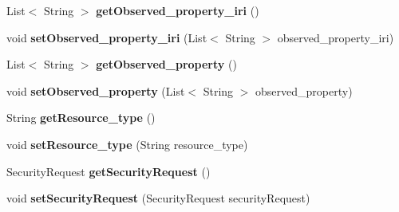 \begin{DoxyCompactItemize}
List$<$ String $>$ {\bfseries get\+Observed\+\_\+property\+\_\+iri} ()
\item 
\mbox{\label{classeu_1_1h2020_1_1symbiote_1_1core_1_1internal_1_1CoreQueryRequest_a1b3772c248abf9efe26d8bb9677edf5d}} 
void {\bfseries set\+Observed\+\_\+property\+\_\+iri} (List$<$ String $>$ observed\+\_\+property\+\_\+iri)
\item 
\mbox{\label{classeu_1_1h2020_1_1symbiote_1_1core_1_1internal_1_1CoreQueryRequest_ada10d758c4139edcbc191a20d68ad844}} 
List$<$ String $>$ {\bfseries get\+Observed\+\_\+property} ()
\item 
\mbox{\label{classeu_1_1h2020_1_1symbiote_1_1core_1_1internal_1_1CoreQueryRequest_a26c2cb28281e7199b76ae30b35115542}} 
void {\bfseries set\+Observed\+\_\+property} (List$<$ String $>$ observed\+\_\+property)
\item 
\mbox{\label{classeu_1_1h2020_1_1symbiote_1_1core_1_1internal_1_1CoreQueryRequest_a461bf6709309d4a165689eb117df3004}} 
String {\bfseries get\+Resource\+\_\+type} ()
\item 
\mbox{\label{classeu_1_1h2020_1_1symbiote_1_1core_1_1internal_1_1CoreQueryRequest_a50c9a6492353091bd20347b799a7cd6a}} 
void {\bfseries set\+Resource\+\_\+type} (String resource\+\_\+type)
\item 
\mbox{\label{classeu_1_1h2020_1_1symbiote_1_1core_1_1internal_1_1CoreQueryRequest_a329e2d0ead8e82d88799dae4c8b760f4}} 
Security\+Request {\bfseries get\+Security\+Request} ()
\item 
\mbox{\label{classeu_1_1h2020_1_1symbiote_1_1core_1_1internal_1_1CoreQueryRequest_aa06c38e53a146db4a06f06e0e604b705}} 
void {\bfseries set\+Security\+Request} (Security\+Request security\+Request)
\item 
\mbox{\label{classeu_1_1h2020_1_1symbiote_1_1core_1_1internal_1_1CoreQueryRequest_a3824cda437d1c58d5c713460f79cac1f}} 

\end{DoxyCompactItemize}
